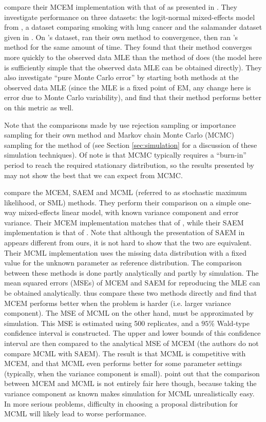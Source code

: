 \documentclass[ss]{imsart}
\theoremstyle{plain}
\theoremstyle{definition}
\theoremstyle{remark}
\begin{document}
\citet{Boo99} compare their MCEM implementation with that of \citet{Wei90} as presented in \citet{McC97}. They investigate performance on three datasets: the logit-normal mixed-effects model from \citet{McC97}, a dataset comparing smoking with lung cancer \citep{Dor54} and the salamander dataset given in \citet{McC89}. On \citeauthor{McC97}'s dataset, \citeauthor{Boo99} ran their own method to convergence, then ran \citeauthor{Wei90}'s method for the same amount of time. They found that their method converges more quickly to the observed data MLE than the method of \citeauthor{Wei90} does (the model here is sufficiently simple that the observed data MLE can be obtained directly). They also investigate ``pure Monte Carlo error'' by starting both methods at the observed data MLE (since the MLE is a fixed point of EM, any change here is error due to Monte Carlo variability), and find that their method performs better on this metric as well.

Note that the comparisons made by \citeauthor{Boo99} use rejection sampling or importance sampling for their own method and Markov chain Monte Carlo (MCMC) sampling for the method of \citet{Wei90} (see Section \ref{sec:simulation} for a discussion of these simulation techniques). Of note is that MCMC typically requires a ``burn-in'' period to reach the required stationary distribution, so the results presented by \citeauthor{Boo99} may not show the best that we can expect from MCMC.

\citet{Boo01} compare the MCEM, SAEM and MCML (referred to as stochastic maximum likelihood, or SML) methods. They perform their comparison on a simple one-way mixed-effects linear model, with known variance component and error variance. Their MCEM implementation matches that of \citet{Boo99}, while their SAEM implementation is that of \citealp{Del99}. Note that although the presentation of SAEM in \citeauthor{Boo01} appears different from ours, it is not hard to show that the two are equivalent. Their MCML implementation uses the missing data distribution with a fixed value for the unknown parameter as reference distribution. The comparison between these methods is done partly analytically and partly by simulation. The mean squared errors (MSEs) of MCEM and SAEM for reproducing the MLE can be obtained analytically. \citeauthor{Boo01} thus compare these two methods directly and find that MCEM performs better when the problem is harder (i.e. larger variance component). The MSE of MCML on the other hand, must be approximated by simulation. This MSE is estimated using 500 replicates, and a $95\%$ Wald-type confidence interval is constructed. The upper and lower bounds of this confidence interval are then compared to the analytical MSE of MCEM (the authors do not compare MCML with SAEM). The result is that MCML is competitive with MCEM, and that MCML even performs better for some parameter settings (typically, when the variance component is small). \citeauthor{Boo01} point out that the comparison between MCEM and MCML is not entirely fair here though, because taking the variance component as known makes simulation for MCML unrealistically easy. In more serious problems, difficulty in choosing a proposal distribution for MCML will likely lead to worse performance.
\end{document}
